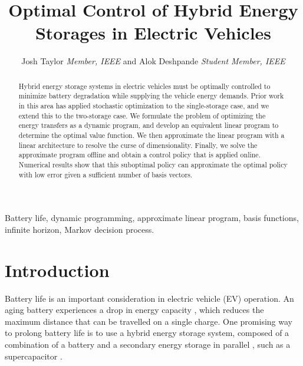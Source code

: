\documentclass[conference]{IEEEtran}
\begin{document}
\title{Optimal Control of Hybrid Energy Storages in Electric Vehicles}

\author{Josh Taylor \textit{Member, IEEE} and Alok Deshpande \textit{Student Member, IEEE} %
}


\maketitle

\begin{abstract}
Hybrid energy storage systems in electric vehicles must be optimally controlled to minimize battery degradation while supplying the vehicle energy demands. Prior work in this area has applied stochastic optimization to the single-storage case, and we extend this to the two-storage case. We formulate the problem of optimizing the energy transfers as a dynamic program, and develop an equivalent linear program to determine the optimal value function. We then approximate the linear program with a linear architecture to resolve the curse of dimensionality. Finally, we solve the approximate program offline and obtain a control policy that is applied online. Numerical results show that this suboptimal policy can approximate the optimal policy with low error given a sufficient number of basis vectors.
\end{abstract}
\begin{IEEEkeywords}
Battery life, dynamic programming, approximate linear program, basis functions, infinite horizon, Markov decision process.
\end{IEEEkeywords}

\section{Introduction}
Battery life is an important consideration in electric vehicle (EV) operation. An aging battery experiences a drop in energy capacity \cite{shi2017optimal}, which reduces the maximum distance that can be travelled on a single charge. One promising way to prolong battery life is to use a hybrid energy storage system, composed of a combination of a battery and a secondary energy storage in parallel \cite{thounthong2009energy}, such as a supercapacitor \cite{bambang2014energy,thounthong2009energy,7939849}. 
\end{document}
